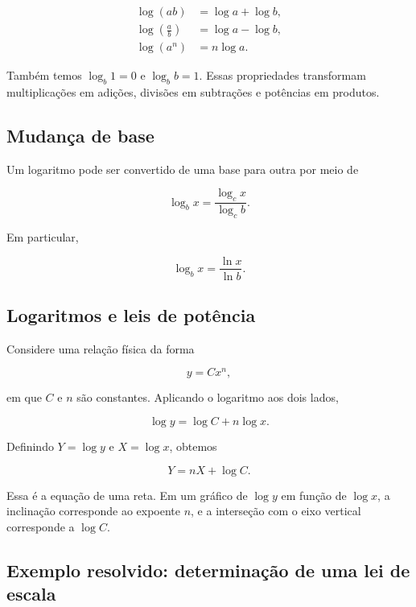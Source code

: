 \begin{align}
  \log(ab) &= \log a+\log b,\\
  \log\left(\frac{a}{b}\right) &= \log a-\log b,\\
  \log(a^n) &= n\log a.
\end{align}

Também temos $\log_b1=0$ e $\log_bb=1$. Essas propriedades transformam multiplicações em adições, divisões em subtrações e potências em produtos.

\subsection{Mudança de base}

Um logaritmo pode ser convertido de uma base para outra por meio de

\begin{equation}
  \log_bx=\frac{\log_cx}{\log_cb}.
\end{equation}

Em particular,

\begin{equation}
  \log_bx=\frac{\ln x}{\ln b}.
\end{equation}

\subsection{Logaritmos e leis de potência}

Considere uma relação física da forma

\begin{equation}
  y=Cx^n,
\end{equation}

em que $C$ e $n$ são constantes. Aplicando o logaritmo aos dois lados,

\begin{equation}
  \log y=\log C+n\log x.
\end{equation}

Definindo $Y=\log y$ e $X=\log x$, obtemos

\begin{equation}
  Y=nX+\log C.
\end{equation}

Essa é a equação de uma reta. Em um gráfico de $\log y$ em função de $\log x$, a inclinação corresponde ao expoente $n$, e a interseção com o eixo vertical corresponde a $\log C$.

\subsection*{Exemplo resolvido: determinação de uma lei de escala}

